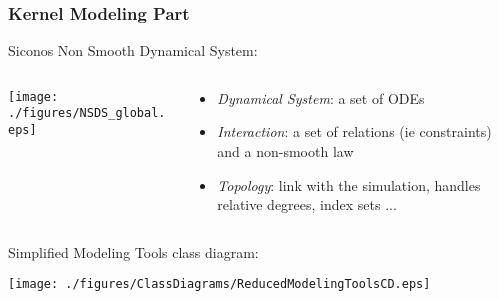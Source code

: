 {
\frametitle{Kernel Modeling Part}
Siconos Non Smooth Dynamical System:
\begin{columns}
  \begin{column}[t]{5cm}
    \begin{center}%
        \texttt{[image: ./figures/NSDS\_global.eps]}\\
      \end{center}
  \end{column}
  \begin{column}[t]{5cm}
    \vspace{1cm}
    \begin{itemize}
    \item {\it Dynamical System}: a set of ODEs
    \item {\it Interaction}: a set of relations (ie constraints) and a non-smooth law
      \pause
    \item {\it Topology}: link with the simulation, handles relative degrees, index sets ...
    \end{itemize}
  \end{column}
\end{columns}
\vspace{0.3cm}
Simplified Modeling Tools class diagram:
\begin{center}%
  \texttt{[image: ./figures/ClassDiagrams/ReducedModelingToolsCD.eps]}\\
\end{center}
}

